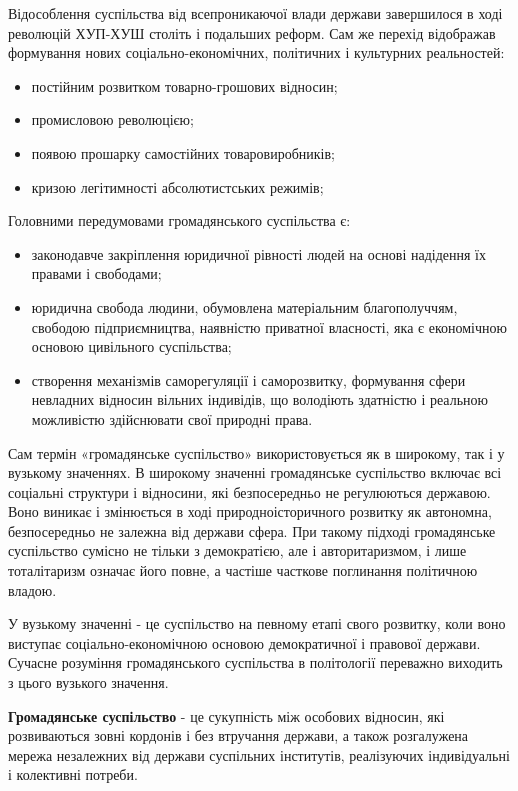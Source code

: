 Відособлення суспільства від всепроникаючої влади держави завершилося в ході революцій ХУП-ХУШ століть і подальших реформ. Сам же перехід відображав формування нових соціально-економічних, політичних і культурних реальностей:
\begin{itemize}
\item постійним розвитком товарно-грошових відносин;
\item промисловою революцією;
\item появою прошарку самостійних товаровиробників;
\item кризою легітимності абсолютистських режимів;
\end{itemize}
Головними передумовами громадянського суспільства є:
\begin{itemize}
\item законодавче закріплення юридичної рівності людей на основі надідення їх правами і свободами;
\item юридична свобода людини, обумовлена матеріальним благополуччям, свободою підприємництва, наявністю приватної власності, яка є економічною основою цивільного суспільства;
\item створення механізмів саморегуляції і саморозвитку, формування сфери невладних відносин вільних індивідів, що володіють здатністю і реальною можливістю здійснювати свої природні права.
\end{itemize}
Сам термін «громадянське суспільство» використовується як в широкому, так і у вузькому значеннях. В широкому значенні громадянське суспільство включає всі соціальні структури і відносини, які безпосередньо не регулюються державою. Воно виникає і змінюється в ході природноісторичного розвитку як автономна, безпосередньо не залежна від держави сфера. При такому підході громадянське суспільство сумісно не тільки з демократією, але і авторитаризмом, і лише тоталітаризм означає його повне, а частіше часткове поглинання політичною владою.

У вузькому значенні - це суспільство на певному етапі свого розвитку, коли воно виступає соціально-економічною основою демократичної і правової держави. Сучасне розуміння громадянського суспільства в політології переважно виходить з цього вузького значення.

\textbf{Громадянське суспільство} - це сукупність між особових відносин, які розвиваються зовні кордонів і без втручання держави, а також розгалужена мережа незалежних від держави суспільних інститутів, реалізуючих індивідуальні і колективні потреби.

